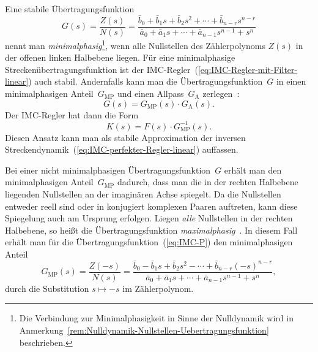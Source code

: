 Eine stabile Übertragungsfunktion
\begin{equation}
G(s)=\frac{Z(s)}{N(s)}=\frac{\bar{b}_{0}+\bar{b}_{1}s+\bar{b}_{2}s^{2}+\cdots+\bar{b}_{n-r}s^{n-r}}{\bar{a}_{0}+\bar{a}_{1}s+\cdots+\bar{a}_{n-1}s^{n-1}+s^{n}}\label{eq:IMC-P}
\end{equation}
nennt man \emph{minimalphasig}\footnote{Die Verbindung zur Minimalphasigkeit in Sinne der Nulldynamik wird
in Anmerkung~\ref{rem:Nulldynamik-Nullstellen-Uebertragungsfunktion}
beschrieben.},
wenn alle Nullstellen des Zählerpolynoms $Z(s)$ in der offenen linken
Halbebene liegen. Für eine minimalphasige Streckenübertragungsfunktion
ist der IMC-Regler~(\ref{eq:IMC-Regler-mit-Filter-linear}) auch
stabil. Andernfalls kann man die Übertragungsfunktion~$G$ in einen
minimalphasigen Anteil~$G_{\text{MP}}$ und einen Allpass~$G_{\text{A}}$
zerlegen~\cite{lunze2007}:
\begin{equation}
G(s)=G_{\text{MP}}(s)\cdot G_{\text{A}}(s).\label{eq:zerlegung-minimalphasig-allpass}
\end{equation}
Der IMC-Regler hat dann die Form
\begin{equation}
K(s)=F(s)\cdot G_{\text{MP}}^{-1}(s).\label{eq:IMC-Regler-mit-Filter-minimalphasig}
\end{equation}
Diesen Ansatz kann man als stabile Approximation der inversen Strecken\-dynamik~(\ref{eq:IMC-perfekter-Regler-linear})
auffassen.

\begin{remark}
\label{rem:Uebertragungsfunktion-minimalphasiger-Anteil}Bei einer
nicht minimal\-phasigen Übertragungsfunktion~$G$ erhält man den
minimal\-phasigen Anteil~$G_{\text{MP}}$ dadurch, dass man die
in der rechten Halbebene liegenden Nullstellen an der imaginären Achse
spiegelt. Da die Nullstellen entweder reell sind oder in konjugiert
komplexen Paaren auftreten, kann diese Spiegelung auch am Ursprung
erfolgen. Liegen \textit{alle} Nullstellen in der rechten Halbebene,
so heißt die Übertragungsfunktion \emph{maximal\-phasig}~\cite{doyle96}.
In diesem Fall erhält man für die Übertragungsfunktion~(\ref{eq:IMC-P})
den minimal\-phasigen Anteil 
\begin{equation}
G_{\text{MP}}(s)=\frac{Z(-s)}{N(s)}=\frac{\bar{b}_{0}-\bar{b}_{1}s+\bar{b}_{2}s^{2}-\cdots+\bar{b}_{n-r}(-s)^{n-r}}{\bar{a}_{0}+\bar{a}_{1}s+\cdots+\bar{a}_{n-1}s^{n-1}+s^{n}},\label{eq:IMC-PMP}
\end{equation}
durch die Substitution $s\mapsto-s$ im Zählerpolynom.
\end{remark}

